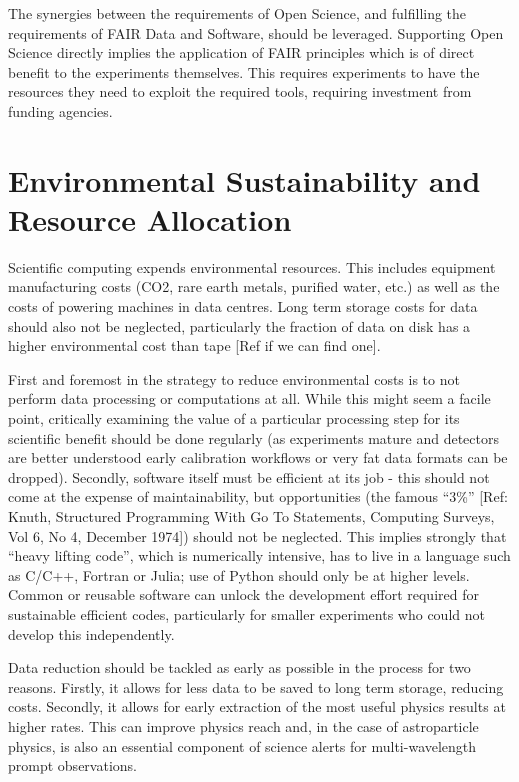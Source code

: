 The synergies between the requirements of Open Science, and fulfilling the requirements of FAIR Data and Software, should be leveraged.  Supporting Open Science directly implies the application of FAIR principles which is of direct benefit to the experiments themselves. This requires experiments to have the resources they need to exploit the required tools, requiring investment from funding agencies.


\section{Environmental Sustainability and Resource Allocation}

Scientific computing expends environmental resources. This includes equipment manufacturing costs (CO2, rare earth metals, purified water, etc.) as well as the costs of powering machines in data centres. Long term storage costs for data should also not be neglected, particularly the fraction of data on disk has a higher environmental cost than tape [Ref if we can find one]. 

First and foremost in the strategy to reduce environmental costs is to not perform data processing or computations at all. While this might seem a facile point, critically examining the value of a particular processing step for its scientific benefit should be done regularly (as experiments mature and detectors are better understood early calibration workflows or very fat data formats can be dropped). Secondly, software itself must be efficient at its job - this should not come at the expense of maintainability, but opportunities (the famous “3\%” [Ref: Knuth, Structured Programming With Go To Statements, Computing Surveys, Vol 6, No 4, December 1974]) should not be neglected. This implies strongly that “heavy lifting code”, which is numerically intensive, has to live in a language such as C/C++, Fortran or Julia; use of Python should only be at higher levels. Common or reusable software can unlock the development effort required for sustainable efficient codes, particularly for smaller experiments who could not develop this independently.

Data reduction should be tackled as early as possible in the process for two reasons. Firstly, it allows for less data to be saved to long term storage, reducing costs. Secondly, it allows for early extraction of the most useful physics results at higher rates. This can improve physics reach and, in the case of astroparticle physics, is also an essential component of science alerts for multi-wavelength prompt observations.

